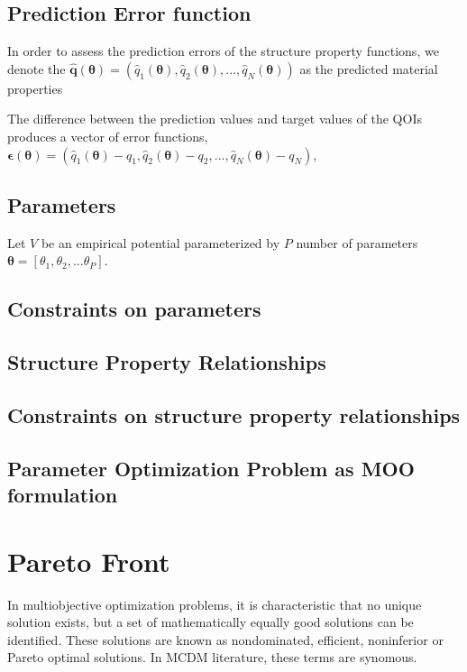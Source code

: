 \subsection{Prediction Error function}
In order to assess the prediction errors of the structure property functions, we denote the
      $\hat{\bm{q}}(\bm{\theta})=(
          \hat{q}_1(\bm{\theta}),
          \hat{q}_2(\bm{\theta}),
          ...,
          \hat{q}_N(\bm{\theta}))$
    as the predicted material properties

The difference between the prediction values and target values of the QOIs produces a vector of error functions, $\bm{\epsilon}(\bm{\theta})=(
        \hat{q}_1(\bm{\theta})-q_1,
        \hat{q}_2(\bm{\theta})-q_2,
        ...,
        \hat{q}_N(\bm{\theta})-q_N)$,
\subsection{Parameters}
Let $V$ be an empirical potential parameterized by $P$ number of parameters $\bm{\theta}=[\theta_1,\theta_2,...\theta_P]$.
\subsection{Constraints on parameters}
\subsection{Structure Property Relationships}
\subsection{Constraints on structure property relationships}

\subsection{Parameter Optimization Problem as MOO formulation}


\section{Pareto Front}

In multiobjective optimization problems, it is characteristic that no unique solution exists, but a set of mathematically equally good solutions can be identified.  These solutions are known as nondominated, efficient, noninferior or Pareto optimal solutions.  In MCDM literature, these terms are synomous.

